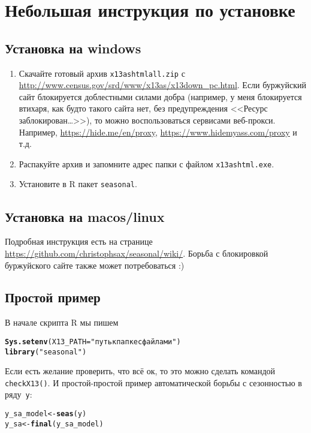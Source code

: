 \documentclass[final,pdftex]{../../template/epsilonj}\usepackage[]{graphicx}\usepackage[]{color}
\makeatletter
\newcommand{\hlstr}[1]{\textcolor[rgb]{0.192,0.494,0.8}{#1}}%
\newcommand{\hlstd}[1]{\textcolor[rgb]{0.345,0.345,0.345}{#1}}%
\newcommand{\hlkwb}[1]{\textcolor[rgb]{0.69,0.353,0.396}{#1}}%
\newcommand{\hlkwc}[1]{\textcolor[rgb]{0.333,0.667,0.333}{#1}}%
\newcommand{\hlkwd}[1]{\textcolor[rgb]{0.737,0.353,0.396}{\textbf{#1}}}%
\newenvironment{kframe}{%
 \def\at@end@of@kframe{}%
 \ifinner\ifhmode%
  \def\at@end@of@kframe{\end{minipage}}%
  \begin{minipage}{\columnwidth}%
 \fi\fi%
 \def\FrameCommand##1{\hskip\@totalleftmargin \hskip-\fboxsep
 \colorbox{shadecolor}{##1}\hskip-\fboxsep
     \hskip-\linewidth \hskip-\@totalleftmargin \hskip\columnwidth}%
 \MakeFramed {\advance\hsize-\width
   \@totalleftmargin\z@ \linewidth\hsize
   \@setminipage}}%
 {\par\unskip\endMakeFramed%
 \at@end@of@kframe}
\newenvironment{knitrout}{}{} %
\makeatother
\begin{document}
\section{Небольшая инструкция по установке}


\subsection{Установка на windows}

\begin{enumerate}
\item Скачайте готовый архив \verb|x13ashtmlall.zip| с \url{http://www.census.gov/srd/www/x13as/x13down_pc.html}. Если буржуйский сайт блокируется доблестными силами добра (например, у меня блокируется втихаря, как будто такого сайта нет, без предупреждения <<Ресурс заблокирован\ldots>>), то можно воспользоваться сервисами веб-прокси. Например, \url{https://hide.me/en/proxy}, \url{https://www.hidemyass.com/proxy} и т.д.
\item Распакуйте архив и запомните адрес папки с файлом \verb|x13ashtml.exe|.
\item Установите в R пакет \verb|seasonal|.
\end{enumerate}

\subsection{Установка на macos/linux}

Подробная инструкция есть на странице \url{https://github.com/christophsax/seasonal/wiki/}. Борьба с блокировкой буржуйского сайте также может потребоваться :)


\subsection{Простой пример}
В начале скрипта R мы пишем
\begin{knitrout}
\color{fgcolor}\begin{kframe}
\begin{alltt}
\hlkwd{Sys.setenv}\hlstd{(}\hlkwc{X13_PATH} \hlstd{=}\hlstr{"путь к папке с файлами"}\hlstd{)}
\hlkwd{library}\hlstd{(}\hlstr{"seasonal"}\hlstd{)}
\end{alltt}
\end{kframe}
\end{knitrout}

Если есть желание проверить, что всё ок, то это можно сделать командой \verb|checkX13()|. И простой-простой пример автоматической борьбы с сезонностью в ряду~\verb|y|:
\begin{knitrout}
\color{fgcolor}\begin{kframe}
\begin{alltt}
\hlstd{y_sa_model} \hlkwb{<-} \hlkwd{seas}\hlstd{(y)}
\hlstd{y_sa} \hlkwb{<-} \hlkwd{final}\hlstd{(y_sa_model)}
\end{alltt}
\end{kframe}
\end{knitrout}
\end{document}
